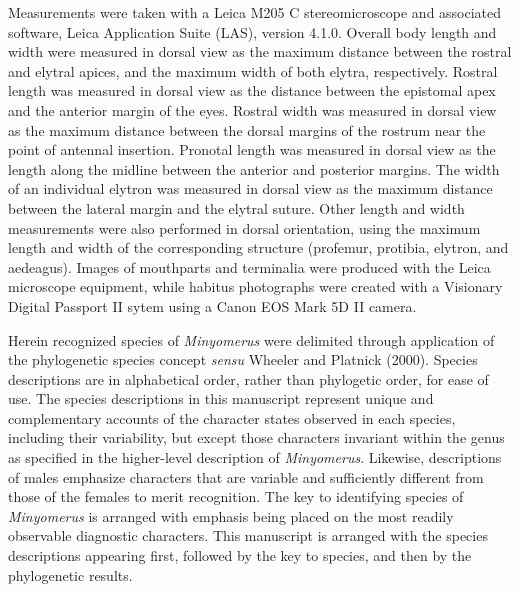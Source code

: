 \documentclass[fleqn,10pt,lineno]{wlpeerj} %
\begin{document}
		Measurements were taken with a Leica M205 C stereomicroscope and associated software, Leica Application Suite (LAS), version 4.1.0.
		Overall body length and width were measured in dorsal view as the maximum distance between the rostral and elytral apices, and the maximum width of both elytra, respectively.
		Rostral length was measured in dorsal view as the distance between the epistomal apex and the anterior margin of the eyes.
		Rostral width was measured in dorsal view as the maximum distance between the dorsal margins of the rostrum near the point of antennal insertion.
		Pronotal length was measured in dorsal view as the length along the midline between the anterior and posterior margins.
		The width of an individual elytron was measured in dorsal view as the maximum distance between the lateral margin and the elytral suture.
		Other length and width measurements were also performed in dorsal orientation, using the maximum length and width of the corresponding structure (profemur, protibia, elytron, and aedeagus).
		Images of mouthparts and terminalia were produced with the Leica microscope equipment, while habitus photographs were created with a Visionary Digital Passport II sytem using a Canon EOS Mark 5D II camera.

		Herein recognized species of \textit{Minyomerus}  were delimited through application of the phylogenetic species concept \textit{sensu} Wheeler and Platnick (2000).
		Species descriptions are in alphabetical order, rather than phylogetic order, for ease of use.
		The species descriptions in this manuscript represent unique and complementary accounts of the character states observed in each species, including their variability, but except those characters invariant within the genus as specified in the higher-level description of \textit{Minyomerus}.
		Likewise, descriptions of males emphasize characters that are variable and sufficiently different from those of the females to merit recognition.
		The key to identifying species of \textit{Minyomerus} is arranged with emphasis being placed on the most readily observable diagnostic characters.
		This manuscript is arranged with the species descriptions appearing first, followed by the key to species, and then by the phylogenetic results.
		
\end{document}

